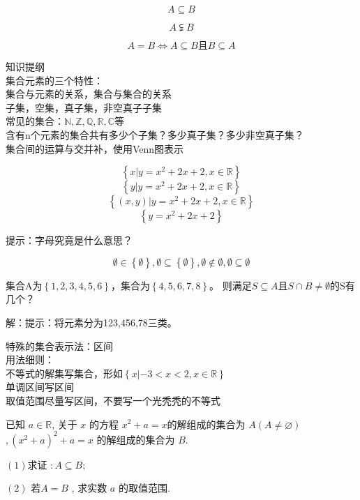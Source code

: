 \begin{definition}[子集]
    \[A\subseteq  B\]

    \[A \subsetneqq B\]
\end{definition}
\begin{theorem}
    \[A=B \Leftrightarrow A\subseteq B \text{且} B\subseteq A \]
\end{theorem}



知识提纲
\\集合元素的三个特性：
\\集合与元素的关系，集合与集合的关系
\\子集，空集，真子集，非空真子子集
\\常见的集合：$\mathbb{N},\mathbb{Z},\mathbb{Q},\mathbb{R},\mathbb{C}$等
\\含有n个元素的集合共有多少个子集？多少真子集？多少非空真子集？
\\集合间的运算与交并补，使用Venn图表示

\begin{example}
    \[\left\{x|y=x^2+2x+2,x\in \mathbb{R} \right\}\]
\[\left\{y|y=x^2+2x+2,x\in \mathbb{R} \right\}\]
\[\left\{(x,y)|y=x^2+2x+2,x\in \mathbb{R} \right\}\]
\[\left\{y=x^2+2x+2 \right\}\]
\end{example}

提示：字母究竟是什么意思？

\begin{example}
    \[
    \emptyset \in \left\{\emptyset\right\},
    \emptyset \subseteq \left\{\emptyset\right\},
    \emptyset \notin \emptyset,
    \emptyset \subseteq \emptyset
\]
\end{example}

\begin{example}集合A为$\left\{1,2,3,4,5,6\right\}$，集合为$\left\{4,5,6,7,8\right\}$。
则满足$S\subseteq A$且$S\cap B\neq \emptyset$的S有几个？
    
\end{example}
解：提示：将元素分为123,456,78三类。


特殊的集合表示法：区间
\\用法细则：
\\不等式的解集写集合，形如$\left\{x|-3<x<2,x \in \mathbb{R} \right\}$
\\单调区间写区间
\\取值范围尽量写区间，不要写一个光秃秃的不等式
\begin{example}
    已知 $ a \in \mathbb{R} $, 关于  $x$ 的方程 $ x^{2}+a=x  $的解组成的集合为 $ A(A \neq   \varnothing)$
    $,\left(x^{2}+a\right)^{2}+a=x $ 的解组成的集合为 $ B .$

$(1) $求证  $: A \subseteq B ;$

$(2)$ 若$  A=B$ , 求实数 $ a $ 的取值范围.
\end{example}


